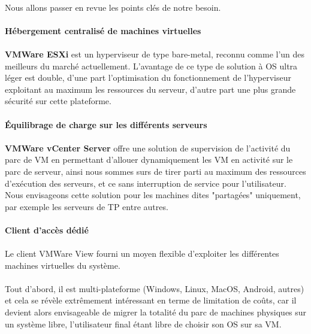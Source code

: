\paragraph{} Nous allons passer en revue les points clés de notre besoin.

\paragraph{Hébergement centralisé de machines virtuelles}

\paragraph{} \textbf{VMWare ESXi} est un hyperviseur de type bare-metal, reconnu
comme l'un des meilleurs du marché actuellement. L'avantage de ce type de
solution à OS ultra léger est double, d'une part l'optimisation du
fonctionnement de l'hyperviseur exploitant au maximum les ressources du serveur,
d'autre part une plus grande sécurité sur cette plateforme.

\paragraph{Équilibrage de charge sur les différents serveurs}

\paragraph{} \textbf{VMWare vCenter Server} offre une solution de supervision de
l'activité du parc de VM en permettant d'allouer dynamiquement les VM en
activité sur le parc de serveur, ainsi nous sommes surs de tirer parti au
maximum des ressources d'exécution des serveurs, et ce sans interruption de
service pour l'utilisateur. Nous envisageons cette solution pour les machines
dites "partagées" uniquement, par exemple les serveurs de TP entre autres.

\paragraph{Client d'accès dédié}
\paragraph{} Le client VMWare View fourni un moyen flexible d'exploiter les
différentes machines virtuelles du système.

\paragraph{} Tout d'abord, il est multi-plateforme (Windows, Linux, MacOS,
Android, autres) et cela se révèle extrêmement intéressant en terme de
limitation de coûts, car il devient alors envisageable de migrer la totalité du
parc de machines physiques  sur un système libre, l'utilisateur final étant
libre de choisir son OS sur sa VM.

